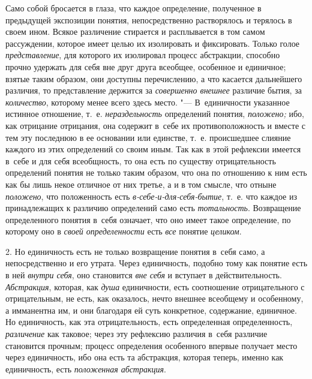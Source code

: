 Само собой бросается в глаза, что каждое определение,
полученное в предыдущей экспозиции понятия, непосредственно растворялось и
терялось в своем ином. Всякое различение стирается и расплывается в том
самом рассуждении, которое имеет целью их изолировать и фиксировать. Только
голое {\em представление},
для которого их изолировал процесс абстракции, способно
прочно удержать для себя вне друг друга всеобщее, особенное и единичное;
взятые таким образом, они доступны перечислению, а что касается дальнейшего
различия, то представление держится за {\em совершенно внешнее}
различие бытия, за {\em количество}, которому менее всего здесь
место. "--- В~единичности указанное истинное отношение, т.~е.
{\em нераздельность} определений понятия, {\em положено;} ибо, как
отрицание отрицания, она содержит в~себе их противоположность и вместе с
тем эту последнюю в ее основании или единстве, т.~е. происшедшее слияние
каждого из этих определений со своим иным. Так как в этой рефлексии
имеется в~себе и для себя всеобщность, то она есть по существу
отрицательность определений понятия не только таким образом, что она по
отношению к ним есть как бы лишь некое отличное от них третье, а и в том
смысле, что отныне {\em положено}, что положенность есть
{\em в-себе-и-для-себя-бытие}, т.~е. что каждое из принадлежащих к различию
определений само есть {\em тотальность}. Возвращение определенного понятия
в~себя означает, что оно имеет такое определение, по которому оно в
{\em своей определенности} есть {\em все} понятие {\em целиком}.

2. Но единичность есть не только возвращение понятия в~себя
само, а непосредственно и его утрата. Через единичность, подобно тому как
понятие есть в ней {\em внутри себя}, оно
становится {\em вне себя} и вступает в действительность.
{\em Абстракция}, которая, как {\em душа}
единичности, есть соотношение отрицательного с отрицательным,
не есть, как оказалось, нечто внешнее всеобщему и особенному, а имманентна
им, и они благодаря ей суть конкретное, содержание, единичное. Но
единичность, как эта отрицательность, есть определенная определенность,
{\em различение} как таковое; через эту рефлексию различия в~себя различие
становится прочным; процесс определения особенного впервые получает место через
единичность, ибо она есть та абстракция, которая теперь, именно как
единичность, есть {\em положенная абстракция}.

